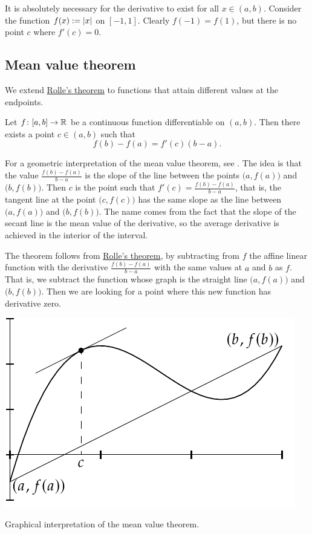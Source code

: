 It is absolutely necessary for the derivative to exist for all $x
\in (a,b)$.  Consider the function $f(x) := \left\lvert {x} \right\rvert$ on $[-1,1]$.
Clearly $f(-1) = f(1)$, but there is no point $c$ where $f'(c) = 0$.

\subsection{Mean value theorem}

We extend \hyperref[thm:rolle]{Rolle's theorem}
to functions that attain different
values at the endpoints.

\begin{thm} \label{thm:mvt}
Let $f \colon [a,b] \to {\mathbb{R}}$ be a continuous function
differentiable on $(a,b)$.  Then there exists a point $c \in (a,b)$
such that
\begin{equation*}
f(b)-f(a) = f'(c)(b-a) .
\end{equation*}
\end{thm}

For a geometric interpretation of the mean value theorem, see
.  The idea is that the value $\frac{f(b)-f(a)}{b-a}$
is the slope of the line between the points $\bigl(a,f(a)\bigr)$
and $\bigl(b,f(b)\bigr)$.
Then $c$ is the point such that $f'(c) = \frac{f(b)-f(a)}{b-a}$, that 
is, the tangent line at the point $\bigl(c,f(c)\bigr)$ has the same slope as the
line between $\bigl(a,f(a)\bigr)$ and $\bigl(b,f(b)\bigr)$.
The name comes from the fact that the slope of the secant line
is the mean value of the derivative, so the average derivative is achieved
in the interior of the interval.

The theorem follows from \hyperref[thm:rolle]{Rolle's theorem},
by subtracting from $f$ the affine linear function with the derivative
$\frac{f(b)-f(a)}{b-a}$ with the same values at $a$ and $b$ as $f$.
That is, we subtract the function whose graph is the straight line
$\bigl(a,f(a)\bigr)$ and $\bigl(b,f(b)\bigr)$.
Then we are looking for a point where this new
function has derivative zero.

\begin{myfigureht}
\includegraphics{figures/mvtfig}
\caption{Graphical interpretation of the mean value theorem.\label{mvtfig}}
\end{myfigureht}


